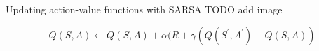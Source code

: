 \bgroup
\begin{frame}{Updating action-value functions with SARSA}
TODO add image

\begin{equation*}
Q(S,A) \leftarrow Q(S,A) + \alpha (R + \gamma (Q(S^{\prime}, A^{\prime}) - Q(S,A))
\end{equation*}
\end{frame}
\egroup